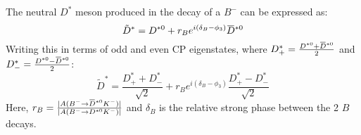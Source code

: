 \documentclass[oneside,12pt]{article}
\newcommand{\overbar}[1]{\mkern 1.5mu\overline{\mkern-1.5mu#1\mkern-1.5mu}\mkern
1.5mu}
\begin{document}
\noindent The neutral ${D}^*$ meson produced in the decay of a $B^-$ can be expressed as:
  \begin{equation}
    \tilde{D}^*=D^{*0}+r_Be^{i(\delta_B-\phi_3)}\overbar{D}^{*0}
    \label{eq:DstTilde}
  \end{equation}
\noindent Writing this in terms of odd and even CP eigenstates, where
$D^{*}_{+}=\frac{D^{*0}+\overbar{D}^{*0}}{2}$ and
$D^{*}_{-}=\frac{D^{*0}-\overbar{D}^{*0}}{2}$:
  \begin{equation}
    \tilde{D}^*=\frac{D^{*}_{+}+D^{*}_{-}}{\sqrt{2}}+r_Be^{i(\delta_B-\phi_3)}\frac{D^{*}_{+}-D^{*}_{-}}{\sqrt{2}}
    \label{eq:DstTildeCP}
  \end{equation}
\noindent Here, $r_B=\frac{|A(B^{-}\rightarrow
\overbar{D}^{*0}K^-)|}{|A(B^{-}\rightarrow {D}^{*0}K^-)|}$ and $\delta_{B}$ is
the relative strong phase between the 2 $B$ decays.
 
\end{document}
